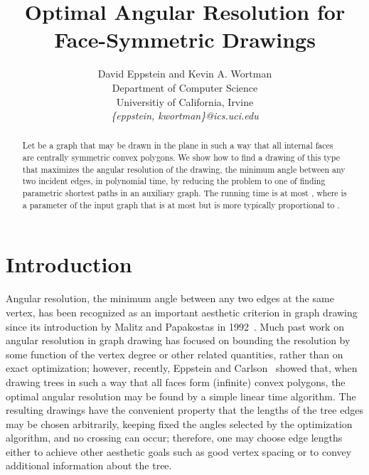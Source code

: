 \documentclass[11pt,letter]{article}
\begin{document}
\lstset{language=Python}

\title{Optimal Angular Resolution for Face-Symmetric Drawings}

\author{David Eppstein and Kevin A. Wortman \\
Department of Computer Science \\
Universitiy of California, Irvine \\
\emph{\{eppstein, kwortman\}@ics.uci.edu}}

\maketitle

\begin{abstract}
Let  be a graph that may be drawn in the plane in such a way that all internal faces are centrally symmetric convex polygons. We show how to find a drawing of this type that maximizes the angular resolution of the drawing, the minimum angle between any two incident edges, in polynomial time, by reducing the problem to one of finding parametric shortest paths in an auxiliary graph.  The running time is at most , where  is a parameter of the input graph that is at most  but is more typically proportional to .
\end{abstract}

\section{Introduction}
Angular resolution, the minimum angle between any two edges at the
same vertex, has been recognized as an important aesthetic criterion
in graph drawing since its introduction by Malitz and Papakostas in
1992~\cite{MalPap-STOC-92}. Much past work on angular resolution in
graph drawing has focused on bounding the resolution by some function
of the vertex degree or other related quantities, rather than on exact optimization; however, recently,
Eppstein and Carlson~\cite{EppCar-GD-06} showed that, when drawing
trees in such a way that all faces form (infinite) convex polygons,
the optimal angular resolution may be found by a simple linear time
algorithm. The resulting drawings have the convenient property that
the lengths of the tree edges may be chosen arbitrarily, keeping fixed
the angles selected by the optimization algorithm, and no crossing can
occur; therefore, one may choose edge lengths either to achieve other
aesthetic goals such as good vertex spacing or to convey additional
information about the tree.
\end{document}
